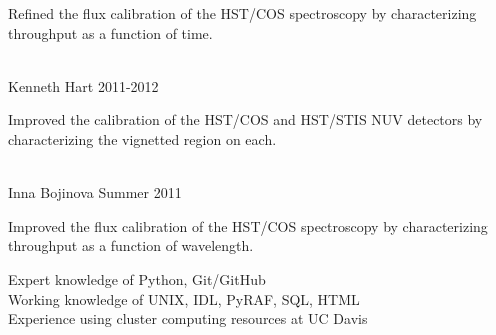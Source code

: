 \documentclass[10pt]{cv}
\begin{document}
\begin{llist}
\begin{minipage}[l]{0.7\textwidth}
Refined the flux calibration of the HST/COS spectroscopy by characterizing throughput as a function of time.\\
\end{minipage}\vspace{0.15cm}
\\
Kenneth Hart \hfill 2011-2012\\
\begin{minipage}[l]{0.7\textwidth}\vspace{0.15cm}
Improved the calibration of the HST/COS and HST/STIS NUV detectors by characterizing the vignetted region on each.\\
\end{minipage}\vspace{0.15cm}
\\
Inna Bojinova \hfill Summer 2011\\
\begin{minipage}[l]{0.7\textwidth}\vspace{0.15cm}
Improved the flux calibration of the HST/COS spectroscopy by characterizing throughput as a function of wavelength.\\
\end{minipage}\vspace{0.15cm}
\vspace{-0.1in}  
Expert knowledge of Python, Git/GitHub\\
Working knowledge of UNIX, IDL, PyRAF, SQL, HTML\\
Experience using cluster computing resources at UC Davis\\ 
%
\vspace{-0.1in}   

\end{llist}
\end{document}
